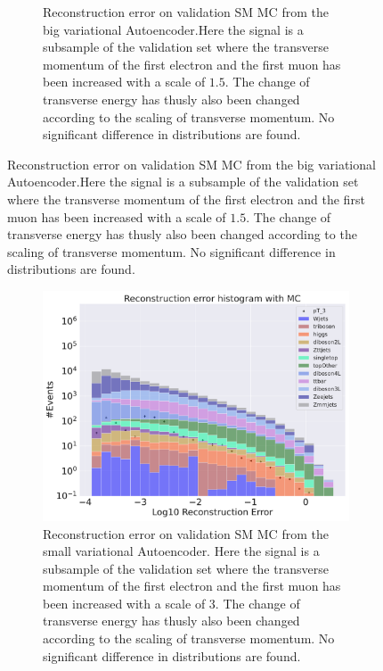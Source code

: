 \begin{figure}[h!]
\begin{subfigure}{.45\textwidth}
        \caption{Reconstruction error on validation SM MC from the big variational Autoencoder.Here the signal is a subsample of the validation 
        set where the transverse momentum of the first electron and the first muon has been increased with a scale of $1.5$. The change of transverse 
        energy has thusly also been changed according to the scaling of transverse momentum. No significant difference in distributions are found. }
        \label{fig:ae_big_pt_1_5}
    \end{subfigure}
    \hfill 
    \label{fig:ae_big_small_pt_1_5}
\end{figure}

\begin{figure}[h!]
    \centering
    \begin{subfigure}{.45\textwidth}
        \includegraphics[width=\textwidth]{Figures/AE_testing/small/b_data_recon_big_rm3_feats_sig_pT_3.pdf}
        \caption{Reconstruction error on validation SM MC from the small variational Autoencoder. Here the signal is a subsample of the validation 
        set where the transverse momentum of the first electron and the first muon has been increased with a scale of $3$. The change of transverse 
        energy has thusly also been changed according to the scaling of transverse momentum. No significant difference in distributions are found. }
        \label{fig:ae_small_pt_3}
    \end{subfigure}
    \hfill 
    \begin{subfigure}{.45\textwidth}

\end{subfigure}
\end{figure}
